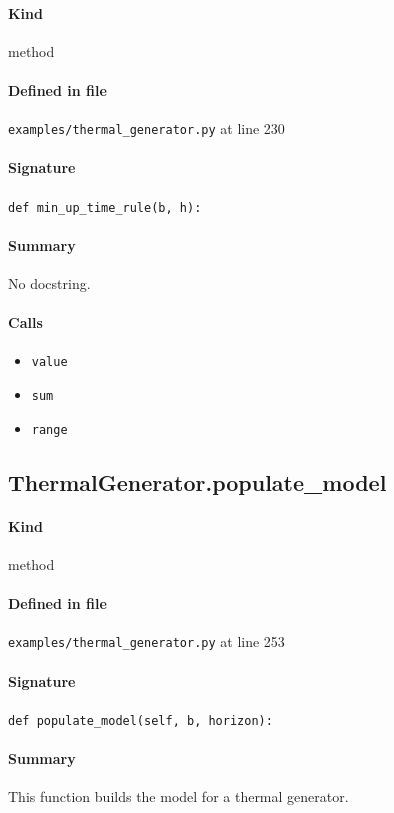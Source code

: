 \documentclass[11pt]{report}
\begin{document}
\paragraph{Kind} method
\paragraph{Defined in file} \texttt{examples/thermal\_generator.py} at line 230
\paragraph{Signature} \texttt{def min\_up\_time\_rule(b, h):}
\paragraph{Summary} No docstring.
\paragraph{Calls}
\begin{itemize}[leftmargin=*]
  \item \texttt{value}
  \item \texttt{sum}
  \item \texttt{range}
\end{itemize}
\subsection{ThermalGenerator.populate\_model}
\label{def:examples-thermal_generator.py:ThermalGenerator.populate_model:L253}
\paragraph{Kind} method
\paragraph{Defined in file} \texttt{examples/thermal\_generator.py} at line 253
\paragraph{Signature} \texttt{def populate\_model(self, b, horizon):}
\paragraph{Summary} This function builds the model for a thermal generator.
\end{document}
